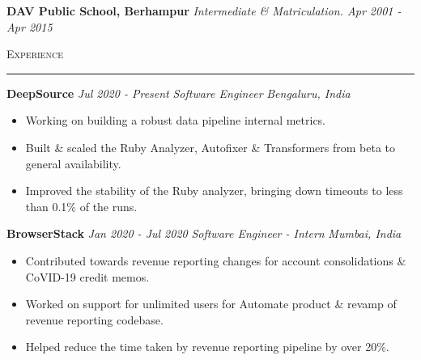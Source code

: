 \documentclass[a4paper, 12pt]{article}
\begin{document}
\textbf{DAV Public School, Berhampur}\newline
\textit{Intermediate \& Matriculation. \hfill Apr 2001 - Apr 2015}
\vspace{0.3cm}



\Large{\textsc{Experience}}\vspace{-0.6cm}\newline
\rule{19cm}{0.01cm}
\vspace{0.1cm}

\large
\textbf{DeepSource} \hfill \textit{\large{Jul 2020 - Present}}\newline
\textit{Software Engineer} \hfill \textit{\large{Bengaluru, India}}\vspace{-0.3cm}
\begin{itemize}
	\item{\normalsize{Working on building a robust data pipeline internal metrics.}}\vspace{-0.5cm}
	\item{\normalsize{Built \& scaled the Ruby Analyzer, Autofixer \& Transformers from beta to general availability.}}\vspace{-0.5cm}
	\item{\normalsize{Improved the stability of the Ruby analyzer, bringing down timeouts to less than 0.1\% of the runs.}}
\end{itemize}
\vspace{0.1cm}
\textbf{BrowserStack} \hfill \textit{\large{Jan 2020 - Jul 2020}}\newline
\textit{Software Engineer - Intern} \hfill \textit{\large{Mumbai, India}}\vspace{-0.3cm}
\begin{itemize}
	\item{\normalsize{Contributed towards revenue reporting changes for account consolidations \& CoVID-19 credit memos.}}\vspace{-0.5cm}
	\item{\normalsize{Worked on support for unlimited users for Automate product \& revamp of revenue reporting codebase.}}\vspace{-0.5cm}
	\item{\normalsize{Helped reduce the time taken by revenue reporting pipeline by over 20\%.}}
\end{itemize}
\vspace{0.2cm}
\end{document}
